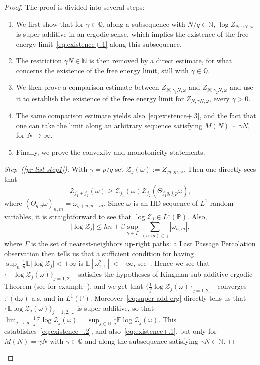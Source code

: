 \documentclass[AHL,Unicode,longabstracts]{cedram}
\newenvironment{step}[1]{\begin{proof}[#1]}{\let\qed\relax\end{proof}}
\newcommand{\gb}{\beta}
\newcommand{\go}{\omega}
\newcommand{\dd}{\mathrm{d}}
\newcommand{\cZ}{\ensuremath{\mathcal{Z}}}
\newcommand{\bbE}{\ensuremath{\mathbb{E}}}
\newcommand{\bbN}{\ensuremath{\mathbb{N}}}
\newcommand{\bbP}{\ensuremath{\mathbb{P}}}
\newcommand{\bbQ}{\ensuremath{\mathbb{Q}}}
\begin{document}
\begin{proof}
The proof is divided into several steps:
\begin{enumerate}
\item\label{pr-list-step1} We first show that for $\gamma \in \bbQ$, along a subsequence with $ N/q\in \bbN$, $\log Z_{N, \gamma N, \go}$ is super-additive in an ergodic sense, which implies the existence of the free energy limit~\eqref{eq:existence+.1} along this subsequence.
\item \label{pr-list-step2} The restriction $\gamma N\in \bbN$ is then removed by a direct estimate, for what concerns the existence of the free energy limit, still with $\gamma \in \bbQ$.
\item \label{pr-list-step3}We then prove a comparison estimate between $Z_{N, \gamma_1 N, \go}$ and $Z_{N, \gamma_2 N, \go}$ and use it to establish the existence of the free energy limit for $Z_{N, \gamma N, \go} $, every $\gamma>0$.
\item \label{pr-list-step4}The same comparison estimate yields also~\eqref{eq:existence+.3}, and the fact that one can take the limit along an arbitrary sequence satisfying $M (N) \sim \gamma N$, for $N \to \infty$.
\item \label{pr-list-step5}Finally, we prove the convexity and monotonicity statements.
\end{enumerate}
\goodbreak

\begin{step}{Step~(\ref{pr-list-step1})}
With $\gamma=p/q$ set $
\cZ_{j}(\go) := Z_{jq, jp, \go}$. Then one directly sees that
\begin{equation}\label{eq:super-add-erg}
\cZ_{j_1+j_2}(\go)\ge \cZ_{j_1}(\go) \cZ_{j_2}\left(\Theta_{j_1 q,j_1 p} \go\right),
\end{equation}
where $(\Theta_{q,p} \go)_{n,m}= \go_{q+n,p+m}$. Since $\go$ is an IID sequence of $L^1$ random variables, it is straightforward to see that $\log \cZ_{j} \in L^1(\bbP)$. Also,
\[
\lvert \log \cZ_{j} \vert \leq h n+ \gb \sup_{\gamma \in \Gamma } \sum_{(n,m)\in\gamma} |\go_{n,m}|,
\]
where $\Gamma$ is the set of nearest-neighbors up-right paths: a Last Passage Percolation observation then tells us that a sufficient condition for having $\sup_n \frac{1}{n} \bbE \lvert\log \cZ_{j} \vert <+\infty$ is $\bbE[\go_{1,1}^2]<+\infty$, see~\cite{cf:Martin02}. Hence we see that $\{ -\log \cZ_{j}(\go)\}_{j=1,2, \ldots}$ satisfies the hypotheses of Kingman sub-additive ergodic Theorem (see for example~\cite[Section~A.7]{cf:GB}), and we get that $\{\frac{1}{j}\log \cZ_{j}(\go)\}_{j=1,2,\ldots}$ converges $\bbP(\dd \go)$-a.s. and in $L^1(\bbP)$. Moreover~\eqref{eq:super-add-erg} directly tells us that $\{\bbE \log \cZ_{j}(\go)\}_{j=1,2, \ldots}$ is super-additive, so that $\lim _{j\to \infty} \frac{1}{j} \bbE \log \cZ_{j}(\go)= \sup_{j\in \bbN} \frac{1}{j} \bbE \log \cZ_{j}(\go)$. This establishes~\eqref{eq:existence+.2}, and also~\eqref{eq:existence+.1}, but only for $M(N)= \gamma N$ with $\gamma \in \bbQ$ and along the subsequence satisfying $\gamma N \in \bbN$.
\end{step}


\end{proof}
\end{document}
